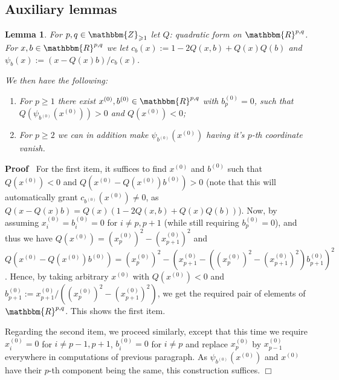 \documentclass{article}
\newcommand{\assign}{:=}
\newenvironment{proof}{\noindent\textbf{Proof\ }}{\hspace*{\fill}$\Box$\medskip}
\numberwithin{definition}{section}
\newtheorem{lemma}{Lemma}
\numberwithin{lemma}{section}
\numberwithin{proposition}{section}
{\theorembodyfont{\rmfamily}\newtheorem{remark}{Remark}
\numberwithin{remark}{section}
}
\begin{document}
\subsection{Auxiliary lemmas}

\begin{lemma}
  \label{lem67:lem-flip}For $p, q \in \mathbbm{Z}_{\geqslant 1}$ let $Q$:
  quadratic form on $\mathbbm{R}^{p, q}$. For $x, b \in \mathbbm{R}^{p, q}$ we
  let $c_b ( x) \assign 1 - 2 Q ( x, b) + Q ( x) Q ( b)$ and $\psi_b ( x)
  \assign ( x - Q ( x) b) / c_b ( x)$.
  
  We then have the following:
  \begin{enumerate}
    \item For $p \geqslant 1$ there exist $x^{( 0)}, b^{( 0)} \in
    \mathbbm{R}^{p, q}$ with $b^{( 0)}_p = 0$, such that $Q ( \psi_{b^{( 0)}}
    ( x^{( 0)})) > 0$ and $Q ( x^{( 0)}) < 0$;
    
    \item For $p \geqslant 2$ we can in addition make $\psi_{b^{( 0)}} ( x^{(
    0)})$ having it's $p$-th coordinate vanish.
  \end{enumerate}
\end{lemma}

\begin{proof}
  For the first item, it suffices to find $x^{( 0)}$ and $b^{( 0)}$ such that
  $Q ( x^{( 0)}) < 0$ and $Q ( x^{( 0)} - Q ( x^{( 0)}) b^{( 0)}) > 0$ (note
  that this will automatically grant $c_{b^{( 0)}} ( x^{( 0)}) \neq 0$, as $Q
  ( x - Q ( x) b) = Q ( x) ( 1 - 2 Q ( x, b) + Q ( x) Q ( b))$). Now, by
  assuming $x_i^{( 0)} = b^{( 0)}_i = 0$ for $i \neq p, p + 1$ (while still
  requiring $b_p^{( 0)} = 0$), and thus we have $Q ( x^{( 0)}) = ( x_p^{(
  0)})^2 - ( x_{p + 1}^{( 0)})^2$ and $Q ( x^{( 0)} - Q ( x^{( 0)}) b^{( 0)})
  = ( x_p^{( 0)})^2 - ( x_{p + 1}^{( 0)} - ( ( x_p^{( 0)})^2 - ( x_{p + 1}^{(
  0)})^2) b^{( 0)}_{p + 1})^2$. Hence, by taking arbitrary $x^{( 0)}$ with $Q
  ( x^{( 0)}) < 0$ and $b_{p + 1}^{( 0)} \assign x_{p + 1}^{( 0)} / ( ( x_p^{(
  0)})^2 - ( x_{p + 1}^{( 0)})^2)$, we get the required pair of elements of
  $\mathbbm{R}^{p, q}$. This shows the first item.
  
  Regarding the second item, we proceed similarly, except that this time we
  require $x_i^{( 0)} = 0$ for $i \neq p - 1, p + 1$, $b^{( 0)}_i = 0$ for $i
  \neq p$ and replace $x_p^{( 0)}$ by $x_{p - 1}^{( 0)}$ everywhere in
  computations of previous paragraph. As $\psi_{b^{( 0)}} ( x^{( 0)})$ and
  $x^{( 0)}$ have their $p$-th component being the same, this construction
  suffices.
\end{proof}
\end{document}
